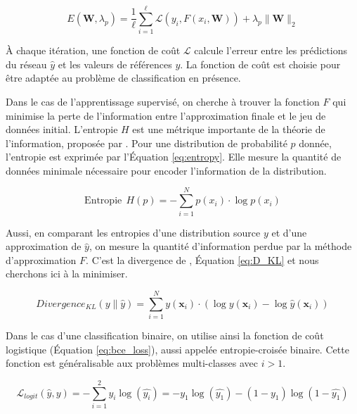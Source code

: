 \begin{equation} \label{eq:VC_error}
E\left(\mathbf{W}, \lambda_{p}\right)=\frac{1}{\ell} \sum_{i=1}^{\ell} \mathcal{L}\left(y_{i}, F\left(x_{i}, \mathbf{W}\right)\right)+\lambda_{p}\|\mathbf{W}\|_{2}
\end{equation}

À chaque itération, une fonction de coût $\mathcal{L}$ calcule l'erreur entre les prédictions du réseau $\hat{y}$ et les valeurs de références $y$.
La fonction de coût est choisie pour être adaptée au problème de classification en présence.

Dans le cas de l'apprentissage supervisé, on cherche à trouver la fonction $F$ qui minimise la perte de l'information entre l'approximation finale et le jeu de données initial.
L'entropie $H$ est une métrique importante de la théorie de l'information, proposée par \cite{shannon_mathematical_1948}.
Pour une distribution de probabilité $p$ donnée, l'entropie est exprimée par l'Équation \ref{eq:entropy}.
Elle mesure la quantité de données minimale nécessaire pour encoder l'information de la distribution.

\begin{equation} \label{eq:entropy}
\text{Entropie} \ \ H(p) =-\sum_{i=1}^{N} p\left(x_{i}\right) \cdot \log p\left(x_{i}\right)
\end{equation}

Aussi, en comparant les entropies d'une distribution source $y$ et d'une approximation de $\hat{y}$, on mesure la quantité d'information perdue par la méthode d'approximation $F$.  %
C'est la divergence de \citeauthor{kullback_information_1951} \cite{kullback_information_1951}, Équation \ref{eq:D_KL} et nous cherchons ici à la minimiser.

\begin{equation} \label{eq:D_KL}
Divergence_{K L}(y \| \hat{y})=\sum_{i=1}^{N} y\left(\mathbf{x}_{i}\right) \cdot\left(\log y\left(\mathbf{x}_{i}\right)-\log \hat{y}\left(\mathbf{x}_{i}\right)\right)
\end{equation}

Dans le cas d'une classification binaire, on utilise ainsi la fonction de coût logistique (Équation \ref{eq:bce_loss}), aussi appelée entropie-croisée binaire. Cette fonction est généralisable aux problèmes multi-classes avec $i > 1$.

\begin{equation} \label{eq:bce_loss}
\mathcal{L}_{logit}\left(\hat{y}, y\right) = -\sum^{2}_{i=1} y_{i} \log \left(\hat{y_{i}}\right) = - y_{1} \log \left(\hat{y_{1}}\right) -\left(1-y_{1}\right) \log \left(1-\hat{y_{1}}\right)
\end{equation}

